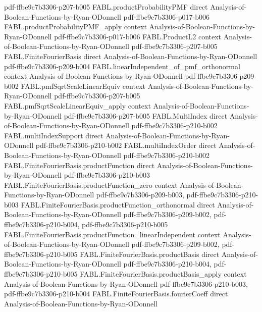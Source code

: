 \begin{theorem}
  {pdf-ffbe9c7b3306-p207-b005}
\proofstep
  {FABL.productProbabilityPMF}
  {direct}
  {Analysis-of-Boolean-Functions-by-Ryan-ODonnell}
  {pdf-ffbe9c7b3306-p017-b006}
\proofstep
  {FABL.productProbabilityPMF_apply}
  {context}
  {Analysis-of-Boolean-Functions-by-Ryan-ODonnell}
  {pdf-ffbe9c7b3306-p017-b006}
\proofstep
  {FABL.ProductL2}
  {context}
  {Analysis-of-Boolean-Functions-by-Ryan-ODonnell}
  {pdf-ffbe9c7b3306-p207-b005}
\proofstep
  {FABL.FiniteFourierBasis}
  {direct}
  {Analysis-of-Boolean-Functions-by-Ryan-ODonnell}
  {pdf-ffbe9c7b3306-p209-b004}
\proofstep
  {FABL.linearIndependent_of_pmf_orthonormal}
  {context}
  {Analysis-of-Boolean-Functions-by-Ryan-ODonnell}
  {pdf-ffbe9c7b3306-p209-b002}
\proofstep
  {FABL.pmfSqrtScaleLinearEquiv}
  {context}
  {Analysis-of-Boolean-Functions-by-Ryan-ODonnell}
  {pdf-ffbe9c7b3306-p207-b005}
\proofstep
  {FABL.pmfSqrtScaleLinearEquiv_apply}
  {context}
  {Analysis-of-Boolean-Functions-by-Ryan-ODonnell}
  {pdf-ffbe9c7b3306-p207-b005}
\proofstep
  {FABL.MultiIndex}
  {direct}
  {Analysis-of-Boolean-Functions-by-Ryan-ODonnell}
  {pdf-ffbe9c7b3306-p210-b002}
\proofstep
  {FABL.multiIndexSupport}
  {direct}
  {Analysis-of-Boolean-Functions-by-Ryan-ODonnell}
  {pdf-ffbe9c7b3306-p210-b002}
\proofstep
  {FABL.multiIndexOrder}
  {direct}
  {Analysis-of-Boolean-Functions-by-Ryan-ODonnell}
  {pdf-ffbe9c7b3306-p210-b002}
\proofstep
  {FABL.FiniteFourierBasis.productFunction}
  {direct}
  {Analysis-of-Boolean-Functions-by-Ryan-ODonnell}
  {pdf-ffbe9c7b3306-p210-b003}
\proofstep
  {FABL.FiniteFourierBasis.productFunction_zero}
  {context}
  {Analysis-of-Boolean-Functions-by-Ryan-ODonnell}
  {pdf-ffbe9c7b3306-p209-b003,
    pdf-ffbe9c7b3306-p210-b003}
\proofstep
  {FABL.FiniteFourierBasis.productFunction_orthonormal}
  {direct}
  {Analysis-of-Boolean-Functions-by-Ryan-ODonnell}
  {pdf-ffbe9c7b3306-p209-b002,
    pdf-ffbe9c7b3306-p210-b004,
    pdf-ffbe9c7b3306-p210-b005}
\proofstep
  {FABL.FiniteFourierBasis.productFunction_linearIndependent}
  {context}
  {Analysis-of-Boolean-Functions-by-Ryan-ODonnell}
  {pdf-ffbe9c7b3306-p209-b002,
    pdf-ffbe9c7b3306-p210-b005}
\proofstep
  {FABL.FiniteFourierBasis.productBasis}
  {direct}
  {Analysis-of-Boolean-Functions-by-Ryan-ODonnell}
  {pdf-ffbe9c7b3306-p210-b004,
    pdf-ffbe9c7b3306-p210-b005}
\proofstep
  {FABL.FiniteFourierBasis.productBasis_apply}
  {context}
  {Analysis-of-Boolean-Functions-by-Ryan-ODonnell}
  {pdf-ffbe9c7b3306-p210-b003,
    pdf-ffbe9c7b3306-p210-b004}
\proofstep
  {FABL.FiniteFourierBasis.fourierCoeff}
  {direct}
  {Analysis-of-Boolean-Functions-by-Ryan-ODonnell}

\end{theorem}
